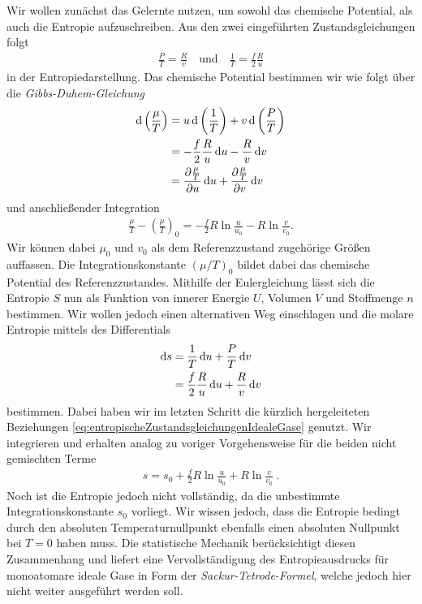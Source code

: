Wir wollen zunächst das Gelernte nutzen, um sowohl das chemische Potential, als auch die Entropie aufzuschreiben. Aus den zwei eingeführten Zustandsgleichungen folgt
\begin{align}
    \label{eq:entropischeZustandsgleichungenIdealeGase}
    \boxed{\frac{P}{T}=\frac{R}{v} \quad\text{und}\quad \frac{1}{T}=\frac{f}{2}\frac{R}{u}}
\end{align}
in der Entropiedarstellung. %
Das chemische Potential bestimmen wir wie folgt über die \emph{Gibbs-Duhem-Gleichung}
\begin{align*}
    \mathop{}\!\mathrm{d} \left(\frac{\mu}{T}\right) & =u\mathop{}\!\mathrm{d}\left(\frac{1}{T}\right)+v\mathop{}\!\mathrm{d} \left(\frac{P}{T}\right)                                    \\
                                     & =-\frac{f}{2}\frac{R}{u}\mathop{}\!\mathrm{d} u-\frac{R}{v}\mathop{}\!\mathrm{d} v                                                 \\
                                     & =\frac{\partial \frac{\mu}{T}}{\partial u}\mathop{}\!\mathrm{d} u+\frac{\partial \frac{\mu}{T}}{\partial v}\mathop{}\!\mathrm{d} v
\end{align*}
und anschließender Integration
\begin{align*}
    \frac{\mu}{T}-\left(\frac{\mu}{T}\right)_0=-\frac{f}{2}R\ln\frac{u}{u_0}-R\ln\frac{v}{v_0}.
\end{align*}
Wir können dabei $\mu_0$ und $v_0$ als dem Referenzzustand zugehörige Größen auffassen.
Die Integrationskonstante $(\mu/T)_0$ bildet dabei das chemische Potential des Referenzzustandes.
Mithilfe der Eulergleichung lässt sich die Entropie $S$ nun als Funktion von innerer Energie $U$, Volumen $V$ und Stoffmenge $n$ bestimmen. Wir wollen jedoch einen alternativen Weg einschlagen und die molare Entropie mittels des Differentials
\begin{align*}
    \mathop{}\!\mathrm{d} s & =\frac{1}{T}\mathop{}\!\mathrm{d} u+\frac{P}{T}\mathop{}\!\mathrm{d} v            \\
            & =\frac{f}{2}\frac{R}{u}\mathop{}\!\mathrm{d} u+\frac{R}{v}\mathop{}\!\mathrm{d} v
\end{align*}
bestimmen.
Dabei haben wir im letzten Schritt die kürzlich hergeleiteten Beziehungen \eqref{eq:entropischeZustandsgleichungenIdealeGase} genutzt.
Wir integrieren und erhalten analog zu voriger Vorgehensweise für die beiden nicht gemischten Terme
\begin{align}
    \label{eq:EntropieEinkomponentigesIdealesGas}
    \boxed{s=s_0+\frac{f}{2}R\ln\frac{u}{u_0}+R\ln\frac{v}{v_0}}\:.
\end{align}
Noch ist die Entropie jedoch nicht vollständig, da die unbestimmte Integrationskonstante $s_0$ vorliegt. Wir wissen jedoch, dass die Entropie \textendash{} bedingt durch den absoluten Temperaturnullpunkt \textendash{} ebenfalls einen absoluten Nullpunkt bei $T=0$ haben muss.
Die statistische Mechanik berücksichtigt diesen Zusammenhang und liefert eine Vervollständigung des Entropieausdrucks für monoatomare ideale Gase in Form der \emph{Sackur-Tetrode-Formel}, welche jedoch hier nicht weiter ausgeführt werden soll.

